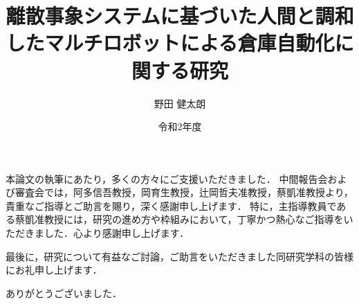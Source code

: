 \documentclass[dvipdfmx]{newthesis}
\title{離散事象システムに基づいた人間と調和したマルチロボットによる倉庫自動化に関する研究}
\date{令和2年度}
\affiliation{
  大阪市立大学 工学部 電気情報工学科 \\
  エレクトロニクス領域
}
\author{野田 健太朗}
\begin{document}
\maketitle



\tableofcontents

\listoffigures

\listoftables


\clearpage


\clearpage


\clearpage


\clearpage


\clearpage


\clearpage

\begin{acknowledgment}
本論文の執筆にあたり，多くの方々にご支援いただきました．
中間報告会および審査会では，阿多信吾教授，岡育生教授，辻岡哲夫准教授，蔡凱准教授より，貴重なご指導とご助言を賜り，深く感謝申し上げます．
特に，主指導教員である蔡凱准教授には，研究の進め方や枠組みにおいて，丁寧かつ熱心なご指導をいただきました．心より感謝申し上げます．

最後に，研究について有益なご討論，ご助言をいただきました同研究学科の皆様にお礼申し上げます．

ありがとうございました．
\end{acknowledgment}

\thesisbib
\end{document}

